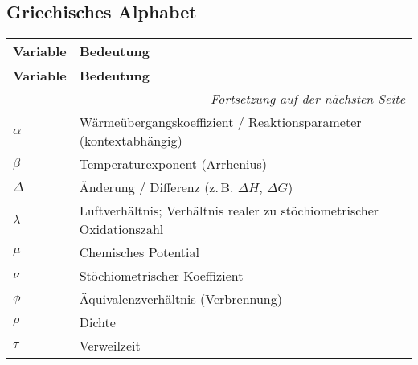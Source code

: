 \subsection*{Griechisches Alphabet}
\begin{small}
\begin{flushleft}
\begin{longtable}{@{}ll@{}}
\toprule
\textbf{Variable} & \textbf{Bedeutung} \\
\midrule
\endfirsthead
\toprule
\textbf{Variable} & \textbf{Bedeutung} \\
\midrule
\endhead
\midrule
\multicolumn{2}{r}{\emph{Fortsetzung auf der nächsten Seite}}\\
\endfoot
\bottomrule
\endlastfoot
$\alpha$            & Wärmeübergangskoeffizient / Reaktionsparameter (kontextabhängig) \\
$\beta$             & Temperaturexponent (Arrhenius) \\
$\Delta$            & Änderung / Differenz (z.\,B. $\Delta H$, $\Delta G$) \\
$\lambda$           & Luftverhältnis; Verhältnis realer zu stöchiometrischer Oxidationszahl \\
$\mu$               & Chemisches Potential \\
$\nu$               & Stöchiometrischer Koeffizient \\
$\phi$              & Äquivalenzverhältnis (Verbrennung) \\
$\rho$              & Dichte \\
$\tau$              & Verweilzeit \\
\end{longtable}
\end{flushleft}
\end{small}

\newpage

